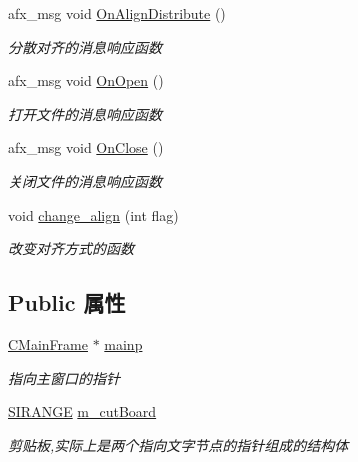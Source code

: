 \begin{DoxyCompactItemize}
afx\+\_\+msg void \hyperlink{class_c_notepad_app_abbcfd489cd0440ed1551fe41396f6cdd}{On\+Align\+Distribute} ()
\begin{DoxyCompactList}\small\item\em 分散对齐的消息响应函数 \end{DoxyCompactList}\item 
\mbox{\label{class_c_notepad_app_afcebb68584ad362f5dfba2449194531d}} 
afx\+\_\+msg void \hyperlink{class_c_notepad_app_afcebb68584ad362f5dfba2449194531d}{On\+Open} ()
\begin{DoxyCompactList}\small\item\em 打开文件的消息响应函数 \end{DoxyCompactList}\item 
\mbox{\label{class_c_notepad_app_a9fcc45c39d4fb4866c0b7f2e1f1b27c0}} 
afx\+\_\+msg void \hyperlink{class_c_notepad_app_a9fcc45c39d4fb4866c0b7f2e1f1b27c0}{On\+Close} ()
\begin{DoxyCompactList}\small\item\em 关闭文件的消息响应函数 \end{DoxyCompactList}\item 
\mbox{\label{class_c_notepad_app_aedb9f07cbb0e5ef12c51f6e829c3a1bf}} 
void \hyperlink{class_c_notepad_app_aedb9f07cbb0e5ef12c51f6e829c3a1bf}{change\+\_\+align} (int flag)
\begin{DoxyCompactList}\small\item\em 改变对齐方式的函数 \end{DoxyCompactList}\end{DoxyCompactItemize}
\subsection*{Public 属性}
\begin{DoxyCompactItemize}
\item 
\mbox{\label{class_c_notepad_app_a9eee0a246d98c97f2554d5bd292bf3f1}} 
\hyperlink{class_c_main_frame}{C\+Main\+Frame} $\ast$ \hyperlink{class_c_notepad_app_a9eee0a246d98c97f2554d5bd292bf3f1}{mainp}
\begin{DoxyCompactList}\small\item\em 指向主窗口的指针 \end{DoxyCompactList}\item 
\mbox{\label{class_c_notepad_app_a7659b246dc9d6690527694f35d31416f}} 
\hyperlink{struct_s_i_r_a_n_g_e}{S\+I\+R\+A\+N\+GE} \hyperlink{class_c_notepad_app_a7659b246dc9d6690527694f35d31416f}{m\+\_\+cut\+Board}
\begin{DoxyCompactList}\small\item\em 剪贴板,实际上是两个指向文字节点的指针组成的结构体 \end{DoxyCompactList}\end{DoxyCompactItemize}


